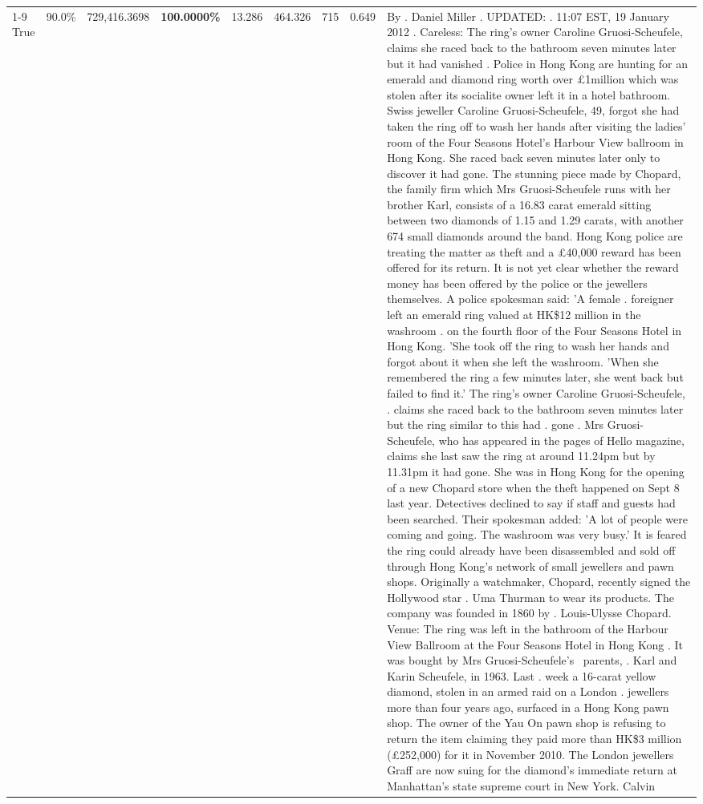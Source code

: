\begin{table}[H]
\begin{tabular}{lllrlllll}
\cline{1-9}
True & 90.0\% & 729,416.3698 & \bfseries \color{red} 100.0000\% & 13.286 & 464.326 & 715 & 0.649 & By . Daniel Miller . UPDATED: . 11:07 EST, 19 January 2012 . Careless: The ring's owner Caroline Gruosi-Scheufele, claims she raced back to the bathroom seven minutes later but it had vanished . Police in Hong Kong are hunting for an emerald and diamond ring worth over £1million which was stolen after its socialite owner left it in a hotel bathroom. Swiss jeweller Caroline Gruosi-Scheufele, 49, forgot she had taken the ring off to wash her hands after visiting the ladies' room of the Four Seasons Hotel's Harbour View ballroom in Hong Kong. She raced back seven minutes later only to discover it had gone. The stunning piece made by Chopard, the family firm which Mrs Gruosi-Scheufele runs with her brother Karl, consists of a 16.83 carat emerald sitting between two diamonds of 1.15 and 1.29 carats, with another 674 small diamonds around the band. Hong Kong police are treating the matter as theft and a £40,000 reward has been offered for its return. It is not yet clear whether the reward money has been offered by the police or the jewellers themselves. A police spokesman said: 'A female . foreigner left an emerald ring valued at HK\$12 million in the washroom . on the fourth floor of the Four Seasons Hotel in Hong Kong. 'She took off the ring to wash her hands and forgot about it when she left the washroom. 'When she remembered the ring a few minutes later, she went back but failed to find it.' The ring's owner Caroline Gruosi-Scheufele, . claims she raced back to the bathroom seven minutes later but the ring similar to this had . gone . Mrs Gruosi-Scheufele, who has appeared in the pages of Hello magazine, claims she last saw the ring at around 11.24pm but by 11.31pm it had gone. She was in Hong Kong for the opening of a new Chopard store when the theft happened on Sept 8 last year. Detectives declined to say if staff and guests had been searched. Their spokesman added: 'A lot of people were coming and going. The washroom was very busy.' It is feared the ring could already have been disassembled and sold off through Hong Kong's network of small jewellers and pawn shops. Originally a watchmaker, Chopard, recently signed the Hollywood star . Uma Thurman to wear its products. The company was founded in 1860 by . Louis-Ulysse Chopard. Venue: The ring was left in the bathroom of the Harbour View Ballroom at the Four Seasons Hotel in Hong Kong . It was bought by Mrs Gruosi-Scheufele's  parents, . Karl and Karin Scheufele, in 1963. Last . week a 16-carat yellow diamond, stolen in an armed raid on a London . jewellers more than four years ago, surfaced in a Hong Kong pawn shop. The owner of the Yau On pawn shop is refusing to return the item claiming they paid more than HK\$3 million (£252,000) for it in November 2010. The London jewellers Graff are now suing for the diamond’s immediate return at Manhattan’s state supreme court in New York. Calvin \\

\end{tabular}
\end{table}
